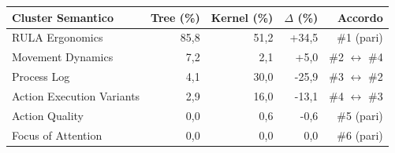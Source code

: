 \begin{tabular*}{\linewidth}{@{}l@{\extracolsep{\fill}}rrrr@{}}
\toprule
\textbf{Cluster Semantico} & \textbf{Tree (\%)} & \textbf{Kernel (\%)} & \textbf{$\Delta$ (\%)} & \textbf{Accordo} \\
\midrule
RULA Ergonomics & 85{,}8 & 51{,}2 & +34{,}5 & \#1 (pari) \\
Movement Dynamics & 7{,}2 & 2{,}1 & +5{,}0 & \#2 $\leftrightarrow$ \#4 \\
Process Log & 4{,}1 & 30{,}0 & -25{,}9 & \#3 $\leftrightarrow$ \#2 \\
Action Execution Variants & 2{,}9 & 16{,}0 & -13{,}1 & \#4 $\leftrightarrow$ \#3 \\
Action Quality & 0{,}0 & 0{,}6 & -0{,}6 & \#5 (pari) \\
Focus of Attention & 0{,}0 & 0{,}0 & 0{,}0 & \#6 (pari) \\
\bottomrule
\end{tabular*}
